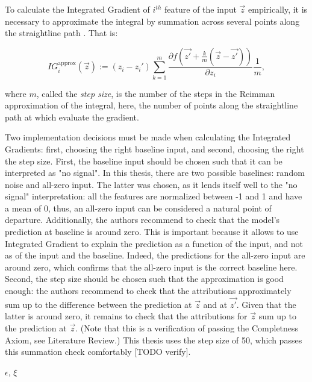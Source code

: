 		To calculate the Integrated Gradient of $i^{th}$ feature of the input $\vec{z}$ empirically, it is necessary to approximate the integral by summation across several points along the straightline path  \citep{sundararajan2017axiomatic}. That is:  
		
		\begin{equation}
			IG_i^{\text{approx}}(\vec{z}) := (z_i - z_i') \sum_{k=1}^{m} \frac{\partial f(\vec{z'} + \frac{k}{m}(\vec{z}-\vec{z'}))}{\partial z_i}\frac{1}{m},
		\end{equation} 

		where $m$, called the \textit{step size}, is the number of the steps in the Reimman approximation of the integral, here, the number of points along the straightline path at which evaluate the gradient. 
		
		Two implementation decisions must be made when calculating the Integrated Gradients: first, choosing the right baseline input, and second, choosing the right the step size. First, the baseline input should be chosen such that it can be interpreted as "no signal". In this thesis, there are two possible baselines: random noise and all-zero input. The latter was chosen, as it lends itself well to the "no signal" interpretation: all the features are normalized between -1 and 1 and have a mean of 0, thus, an all-zero input can be considered a natural point of departure. Additionally, the authors recommend to check that the model's prediction at baseline is around zero. This is important because it allows to use Integrated Gradient to explain the prediction as a function of the input, and not as of the input and the baseline. Indeed, the predictions for the all-zero input are around zero, which confirms that the all-zero input is the correct baseline here. Second, the step size should be chosen such that the approximation is good enough: the authors recommend to check that the attributions approximately sum up to the difference between the prediction at $\vec{z}$ and at $\vec{z'}$. Given that the latter is around zero, it remains to check that the attributions for $\vec{z}$ sum up to the prediction at $\vec{z}$. (Note that this is a verification of passing the Completness Axiom, see Literature Review.) This thesis uses the step size of 50, which passes this summation check comfortably [TODO verify].  
		
		$\epsilon$, $\xi$